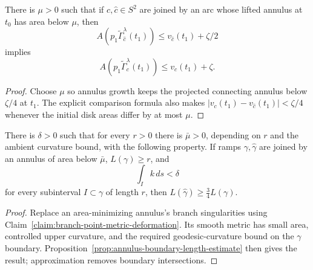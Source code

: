 \begin{lemma}
\label{lem:mu-net-area-comparison}
\label{muarea}
There is $\mu>0$ such that if $c,\hat c\in S^2$ are joined by an arc whose
lifted annulus at $t_0$ has area below $\mu$, then
\[
A(p_1\widetilde\Gamma_{\hat c}^\lambda(t_1))
\le v_{\hat c}(t_1)+\zeta/2
\]
implies
\[
A(p_1\widetilde\Gamma_c^\lambda(t_1))\le v_c(t_1)+\zeta.
\]
\end{lemma}
\begin{proof}
\sketch Choose $\mu$ so annulus growth keeps the projected connecting annulus below
$\zeta/4$ at $t_1$. The explicit comparison formula also makes
$|v_c(t_1)-v_{\hat c}(t_1)|<\zeta/4$ whenever the initial disk areas differ by
at most $\mu$.
\end{proof}

\begin{lemma}
\label{lem:ramp-length-comparison-small-annulus}
\label{BARMU}

There is $\delta>0$ such that for every $r>0$ there is $\bar\mu>0$, depending
on $r$ and the ambient curvature bound, with the following property. If ramps
$\gamma,\hat\gamma$ are joined by an annulus of area below $\bar\mu$,
$L(\gamma)\ge r$, and
\[
\int_I k\,ds<\delta
\]
for every subinterval $I\subset\gamma$ of length $r$, then
$L(\hat\gamma)\ge\frac34L(\gamma)$.
\end{lemma}
\begin{proof}
\sketch Replace an area-minimizing annulus's branch singularities using
Claim~\ref{claim:branch-point-metric-deformation}. Its smooth metric has small
area, controlled upper curvature, and the required geodesic-curvature bound on
the $\gamma$ boundary. Proposition~\ref{prop:annulus-boundary-length-estimate}
then gives the result; approximation removes boundary intersections.
\end{proof}

